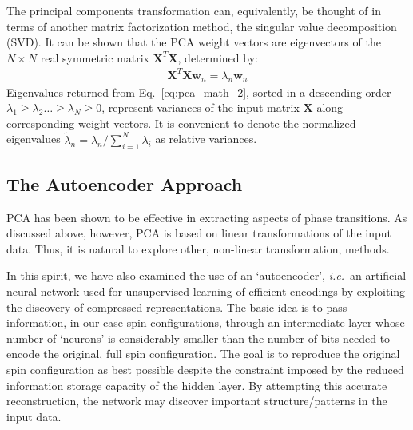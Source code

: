 \documentclass[pra,letterpaper,10pt,twocolumn]{revtex4}
\begin{document}
The principal components transformation can, equivalently, be thought
of in terms of
another matrix factorization method, the singular value decomposition
(SVD). It can be shown that the PCA weight vectors are eigenvectors of the
$N\times N$ real symmetric matrix $\mathbf{X}^T \mathbf{X}$, determined
by\cite{Jolliffe, White}: 
\begin{align} \mathbf{X}^T \mathbf{X}
\mathbf{w}_{n} = \lambda_n \mathbf{w}_{n} 
\label{eq:pca_math_2}
\end{align} 
Eigenvalues returned from Eq.~\ref{eq:pca_math_2}, sorted in
a descending order $\lambda_1\ge \lambda_2 \dots \ge \lambda_N \ge 0$,
represent variances of the input matrix $\mathbf{X}$ along corresponding
weight vectors.  
It is convenient to denote the normalized eigenvalues
$\tilde{\lambda}_n = \lambda_n/\sum_{i=1}^N \lambda_i$ as relative
variances.


\subsection{The Autoencoder Approach}


PCA has been shown to be effective in extracting aspects of
phase transitions\cite{Wang, Bradde}.
As discussed above, however, PCA is based on 
linear transformations of the input data.
Thus, it is natural to explore other, non-linear transformation,
methods.

In this spirit, we have also examined the use of an
`autoencoder'\cite{Bourlard, Hinton, Ruslan}, {\it i.e.}~an artificial
neural network used for unsupervised learning of efficient encodings by
exploiting the discovery of compressed representations.  The basic idea
is to pass information, in our case spin configurations, through an
intermediate layer whose number of `neurons' is considerably smaller
than the number of bits needed to encode the original, full spin
configuration.  The goal is to reproduce the original spin configuration
as best possible despite the constraint imposed by the reduced
information storage capacity of the hidden layer.  By attempting this
accurate reconstruction, the network may discover important
structure/patterns in the input data.
\end{document}
